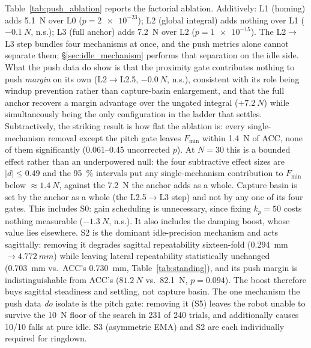 \documentclass[conference]{IEEEtran}
\begin{document}
Table~\ref{tab:push_ablation} reports the factorial ablation.
Additively: L1 (homing) adds \SI{5.1}{N} over L0 ($p{=}\num{2e-23}$); L2 (global integral) adds nothing over L1 ($-\SI{0.1}{N}$, n.s.); L3 (full anchor) adds \SI{7.2}{N} over L2 ($p{=}\num{1e-15}$). The L2$\rightarrow$L3 step bundles four mechanisms at once, and the push metrics alone cannot separate them; \S\ref{sec:idle_mechanism} performs that separation on the idle side. What the push data do show is that the proximity gate contributes nothing to push \emph{margin} on its own (L2$\rightarrow$L2.5, $-\SI{0.0}{N}$, n.s.), consistent with its role being windup prevention rather than capture-basin enlargement, and that the full anchor recovers a margin advantage over the ungated integral ($+\SI{7.2}{N}$) while simultaneously being the only configuration in the ladder that settles.
Subtractively, the striking result is how flat the ablation is: every single-mechanism removal except the pitch gate leaves $F_{\min}$ within \SI{1.4}{N} of ACC, none of them significantly (\SIrange{0.061}{0.45}{} uncorrected $p$). At $N{=}30$ this is a bounded effect rather than an underpowered null: the four subtractive effect sizes are $|d|{\le}0.49$ and the \SI{95}{\percent} intervals put any single-mechanism contribution to $F_{\min}$ below ${\approx}\SI{1.4}{N}$, against the \SI{7.2}{N} the anchor adds as a whole. Capture basin is set by the anchor as a whole (the L2.5$\rightarrow$L3 step) and not by any one of its four gates. This includes S0: gain scheduling is unnecessary, since fixing $k_p{=}50$ costs nothing measurable ($-\SI{1.3}{N}$, n.s.). It also includes the damping boost, whose value lies elsewhere. S2 is the dominant idle-precision mechanism and acts sagittally: removing it degrades sagittal repeatability sixteen-fold (\SI{0.294}{mm}${\rightarrow}\SI{4.772}{mm}$) while leaving lateral repeatability statistically unchanged (\SI{0.703}{mm} vs.\ ACC's \SI{0.730}{mm}, Table~\ref{tab:standing}), and its push margin is indistinguishable from ACC's ($\SI{81.2}{N}$ vs.\ \SI{82.1}{N}, $p{=}0.094$). The boost therefore buys sagittal steadiness and settling, not capture basin. The one mechanism the push data \emph{do} isolate is the pitch gate: removing it (S5) leaves the robot unable to survive the \SI{10}{N} floor of the search in \num{231} of \num{240} trials, and additionally causes \num{10}/\num{10} falls at pure idle. S3 (asymmetric EMA) and S2 are each individually required for ringdown.
\end{document}
